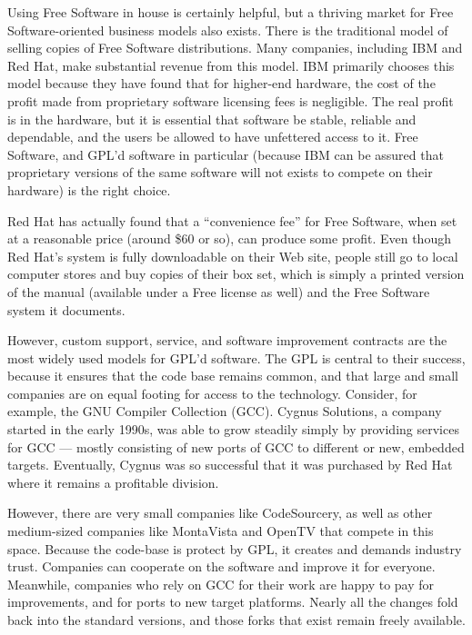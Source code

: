 \documentclass[11pt, letterpaper]{book}
\begin{document}
Using Free Software in house is certainly helpful, but a thriving
market for Free Software-oriented business models also exists. There is the
traditional model of selling copies of Free Software distributions.
Many companies, including IBM and Red Hat, make substantial revenue
from this model. IBM primarily chooses this model because they have
found that for higher-end hardware, the cost of the profit made from
proprietary software licensing fees is negligible. The real profit is
in the hardware, but it is essential that software be stable, reliable
and dependable, and the users be allowed to have unfettered access to
it. Free Software, and GPL'd software in particular (because IBM can
be assured that proprietary versions of the same software will not
exists to compete on their hardware) is the right choice.

Red Hat has actually found that a ``convenience fee'' for Free Software,
when set at a reasonable price (around \$60 or so), can produce some
profit. Even though Red Hat's system is fully downloadable on their
Web site, people still go to local computer stores and buy copies of their
box set, which is simply a printed version of the manual (available under
a Free license as well) and the Free Software system it documents.

\medskip

However, custom support, service, and software improvement contracts
are the most widely used models for GPL'd software. The GPL is
central to their success, because it ensures that the code base
remains common, and that large and small companies are on equal
footing for access to the technology. Consider, for example, the GNU
Compiler Collection (GCC). Cygnus Solutions, a company started in the
early 1990s, was able to grow steadily simply by providing services
for GCC --- mostly consisting of new ports of GCC to different or new,
embedded targets. Eventually, Cygnus was so successful that
it was purchased by Red Hat where it remains a profitable division.

However, there are very small companies like CodeSourcery, as well as
other medium-sized companies like MontaVista and OpenTV that compete in
this space. Because the code-base is protect by GPL, it creates and
demands industry trust. Companies can cooperate on the software and
improve it for everyone. Meanwhile, companies who rely on GCC for their
work are happy to pay for improvements, and for ports to new target
platforms. Nearly all the changes fold back into the standard
versions, and those forks that exist remain freely available.
\end{document}

